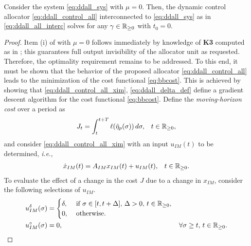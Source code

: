 \begin{lemma}
  \label{lem:ddall_nominal}
  Consider the system \eqref{eq:ddall_sys} with $\mu=0$. Then, the dynamic control allocator \eqref{eq:ddall_control_all} interconnected to \eqref{eq:ddall_sys} as in \eqref{eq:ddall_all_interc} solves  for any $\gamma\in\mathbb{R}_{\geq 0}$ with $t_0=0$.\closestatement
\end{lemma}
\begin{proof}
  \label{pf:ddall_nominal}
  Item (i) of  with $\mu=0$ follows immediately by knowledge of \textbf{K3} computed as in ; this guarantees full output invisibility of the allocator unit as requested. Therefore, the optimality requirement remains to be addressed. To this end, it must be shown that the behavior of the proposed allocator \eqref{eq:ddall_control_all} leads to the minimization of the cost functional \eqref{eq:bbcost}. This is achieved by showing that \eqref{eq:ddall_control_all_xim}, \eqref{eq:ddall_delta_def} define a gradient descent algorithm for the cost functional \eqref{eq:bbcost}. Define the \emph{moving-horizon cost} over a period as
  \begin{align}
    \label{eq:ddall_cost_moving}
    J_{t} &= \int_{t}^{t+T}\ell(\tilde{\eta}_p(\sigma))\,d\sigma, & t\in\mathbb{R}_{\geq 0},
  \end{align}
  and consider \eqref{eq:ddall_control_all_xim} with an input $u_{IM}(t)$ to be determined, \emph{i.e.},
  \begin{align}
    \label{eq:ddall_control_all_xim_mod}
    \dot{x}_{IM}(t) &= A_{IM}x_{IM}(t) + u_{IM}(t), & t\in\mathbb{R}_{\geq 0}.
  \end{align}
  To evaluate the effect of a change in the cost $J$ due to a change in $x_{IM}$, consider the following selections of $u_{IM}$.
  \begin{subequations}
    \label{eq:ddall_u_IM}
  	\begin{align}
  		u^\delta_{IM}(\sigma) &=
  		\begin{cases}
  			\delta, & \text{ if } \sigma \in [t,t+\Delta],\,\Delta>0,\,t\in\mathbb{R}_{\geq 0}, \\
  			0,      & \text{ otherwise. }
  		\end{cases}\label{eq:ddall_u_IM_delta} \\
  		u^\circ_{IM}(\sigma) &= 0, & \forall \sigma\geq t,\,t\in\mathbb{R}_{\geq 0}.\label{eq:ddall_u_IM_circ}
  	\end{align}
  \end{subequations}

\end{proof}
